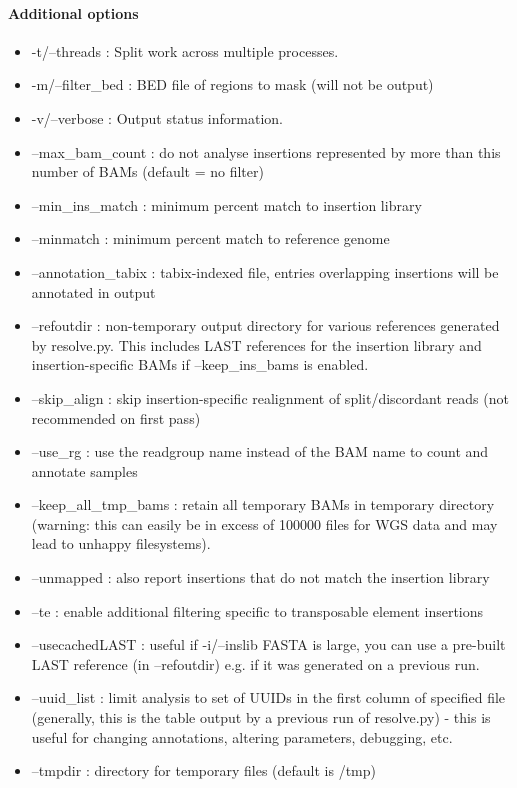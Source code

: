 \documentclass[letterpaper,11pt]{article}
\begin{document}
\paragraph{Additional options}
\begin{itemize}
\item -t/--threads : Split work across multiple processes.
\item -m/--filter\_bed : BED file of regions to mask (will not be output)
\item -v/--verbose : Output status information.
\item --max\_bam\_count : do not analyse insertions represented by more than this number of BAMs (default = no filter)
\item --min\_ins\_match : minimum percent match to insertion library
\item --minmatch : minimum percent match to reference genome
\item --annotation\_tabix : tabix-indexed file, entries overlapping insertions will be annotated in output
\item --refoutdir : non-temporary output directory for various references generated by resolve.py. This includes LAST references for the insertion library and insertion-specific BAMs if --keep\_ins\_bams is enabled.
\item --skip\_align : skip insertion-specific realignment of split/discordant reads (not recommended on first pass)
\item --use\_rg : use the readgroup name instead of the BAM name to count and annotate samples
\item --keep\_all\_tmp\_bams : retain all temporary BAMs in temporary directory (warning: this can easily be in excess of 100000 files for WGS data and may lead to unhappy filesystems).
\item --unmapped : also report insertions that do not match the insertion library
\item --te : enable additional filtering specific to transposable element insertions
\item --usecachedLAST : useful if -i/--inslib FASTA is large, you can use a pre-built LAST reference (in --refoutdir) e.g. if it was generated on a previous run.
\item --uuid\_list : limit analysis to set of UUIDs in the first column of specified file (generally, this is the table output by a previous run of resolve.py) - this is useful for changing annotations, altering parameters, debugging, etc.
\item --tmpdir : directory for temporary files (default is /tmp)
\end{itemize}
\end{document}
